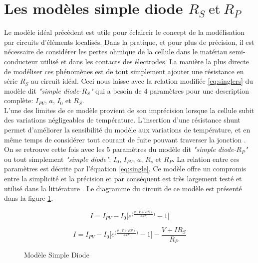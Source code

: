 \section{Les modèles simple diode \texorpdfstring{$R_S\ \text{et}\ R_P$}{Rs et Rp}}
Le modèle idéal précèdent est utile pour éclaircir le concept de la modélisation par circuits d'éléments localisés. Dans la pratique, et pour plus de précision, il est nécessaire de considérer les pertes ohmique de la cellule dans le matériau semi-conducteur utilisé et dans les contacts des électrodes. La manière la plus directe de modéliser ces phénomènes est de tout simplement ajouter une résistance en série $R_S$ au circuit idéal. Ceci nous laisse avec la relation modifiée \ref{eq:singlers} du modèle dit \textit{"simple diode-$R_S$"} qui a besoin de 4 paramètres pour une description complète: $I_{PV}$, $a$, $I_0$ et $R_S$.\\
L'une des limites de ce modèle provient de son imprécision lorsque la cellule subit des variations négligeables de température. L'insertion d'une résistance shunt permet d'améliorer la sensibilité du modèle aux variations de température, et en même temps de considérer tout courant de fuite pouvant traverser la jonction \cite{Chin2015b}. On se retrouve cette fois avec les 5 paramètres du modèle dit \textit{"simple diode-$R_P$"} ou tout simplement \textit{"simple diode"}: $I_0$, $I_{PV}$, $a$, $R_s$ et $R_P$. La relation entre ces paramètres est décrite par l'équation \ref{eq:single}. Ce modèle offre un compromis entre la simplicité et la précision et par conséquent est très largement testé et utilisé dans la littérature \cite{Carrero2007}. Le diagramme du circuit de ce modèle est présenté dans la figure \ref{fig:single}.

\begin{equation}
  \label{eq:singlers}
  I = I_{PV} - I_0 \bigg[e^{\big(\frac{q(V + RS)}{akT}\big)} - 1\bigg]
\end{equation}

\begin{equation}
  \label{eq:single}
  I = I_{PV} - I_0 \bigg[e^{\big(\frac{q(V + RS)}{akT}\big)} - 1\bigg] - \frac{V + I R_S}{R_P}
\end{equation}

\begin{figure}
  \begin{center}
    \shorthandoff{:!}
    \shorthandon{:!}
    \caption{Modèle Simple Diode}
    \label{fig:single}
  \end{center}
\end{figure}



